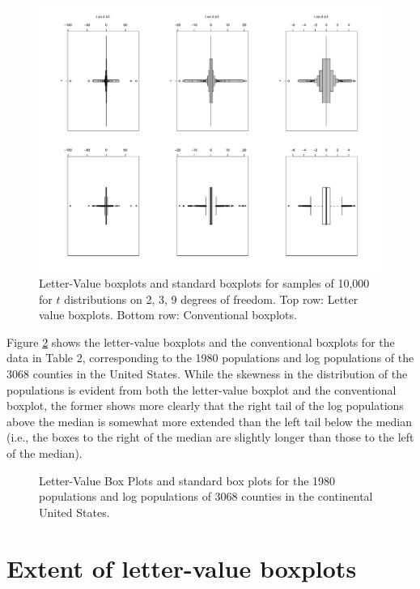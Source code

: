 \documentclass[oneside]{article}
\begin{document}
\begin{figure}[hbtp]
  \centering
  \includegraphics[scale=.5,angle=270]{tplot2kk}

  \caption{Letter-Value boxplots and standard boxplots for samples of 10,000
  for $t$ distributions on 2, 3, 9 degrees of freedom. Top row: Letter value
  boxplots. Bottom row: Conventional boxplots.}
  \label{t-dist}
\end{figure}

Figure \ref{lvpops} shows the letter-value boxplots
and the conventional boxplots for the data in Table 2,
corresponding to the 1980 populations and log populations
of the 3068 counties in the United States.  While the
skewness in the distribution of the populations is
evident from both the letter-value boxplot and the
conventional boxplot, the former shows more clearly
that the right tail of the log populations above the 
median is somewhat more extended than the left tail
below the median (i.e., the boxes to the right of
the median are slightly longer than those to the
left of the median).


\begin{figure}[hbtp]
  \centering

  \caption{Letter-Value Box Plots and standard box plots for the 1980
  populations and log populations of 3068 counties in the continental United
  States.}
  \label{lvpops} 
\end{figure}

\section{Extent of letter-value boxplots}
\label{sec:extent}
\end{document}
